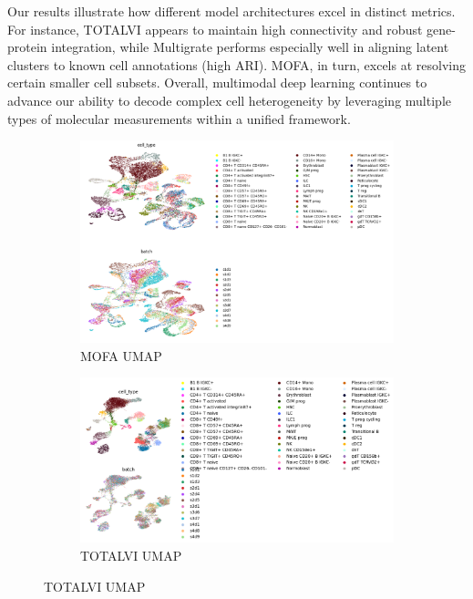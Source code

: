 \documentclass{article}
\begin{document}
Our results illustrate how different model architectures excel in distinct metrics. For instance, 
TOTALVI appears to maintain high connectivity and robust gene-protein integration, while Multigrate 
performs especially well in aligning latent clusters to known cell annotations (high ARI). 
MOFA, in turn, excels at resolving certain smaller cell subsets. Overall, multimodal deep learning 
continues to advance our ability to decode complex cell heterogeneity by leveraging multiple types of 
molecular measurements within a unified framework.
\begin{figure}[h]
    \centering
    \begin{subfigure}{0.8\linewidth}
        \centering
        \includegraphics[width=\linewidth]{mofa_integration}
        \caption{MOFA UMAP}
        \label{fig:mofaintegration}
    \end{subfigure}
    
    \vspace{1em}
    \begin{subfigure}{0.8\linewidth}
        \centering
        \includegraphics[width=\linewidth]{totalvi_integration}
        \caption{TOTALVI UMAP}
        \label{fig:totalviintegration}
    \end{subfigure}
    

\end{figure}
\end{document}
